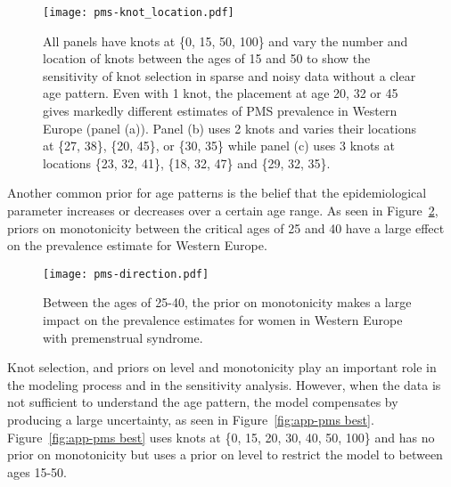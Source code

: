     \begin{figure}
        \begin{center}
            \texttt{[image: pms-knot\_location.pdf]}
        \end{center}
        \caption{All panels have knots at \{0, 15, 50, 100\} and vary
          the number and location of knots between the ages of 15 and
          50 to show the sensitivity of knot selection in sparse and
          noisy data without a clear age pattern. Even with 1 knot,
          the placement at age 20, 32 or 45 gives markedly different
          estimates of PMS prevalence in Western Europe (panel (a)).
          Panel (b) uses 2 knots and varies their locations at \{27,
          38\}, \{20, 45\}, or \{30, 35\} while panel (c) uses 3 knots
          at locations \{23, 32, 41\}, \{18, 32, 47\} and \{29, 32,
          35\}.}
        \label{fig:app-pms knot_loc}
    \end{figure}

Another common prior for age patterns is the belief that the
epidemiological parameter increases or decreases over a certain age
range.  As seen in Figure~\ref{fig:app-pms dir}, priors on
monotonicity between the critical ages of 25 and 40 have a large
effect on the prevalence estimate for Western Europe.

    \begin{figure}
        \begin{center}
            \texttt{[image: pms-direction.pdf]}
        \end{center}
        \caption{Between the ages of 25-40, the prior on monotonicity
          makes a large impact on the prevalence estimates for women
          in Western Europe with premenstrual syndrome.}
        \label{fig:app-pms dir}
    \end{figure}

Knot selection, and priors on level and monotonicity play an important
role in the modeling process and in the sensitivity analysis.  However,
when the data is not sufficient to understand the age pattern, the
model compensates by producing a large uncertainty, as seen in
Figure~\ref{fig:app-pms best}.  Figure~\ref{fig:app-pms best} uses knots
at \{0, 15, 20, 30, 40, 50, 100\} and has no prior on monotonicity but
uses a prior on level to restrict the model to between ages 15-50.


